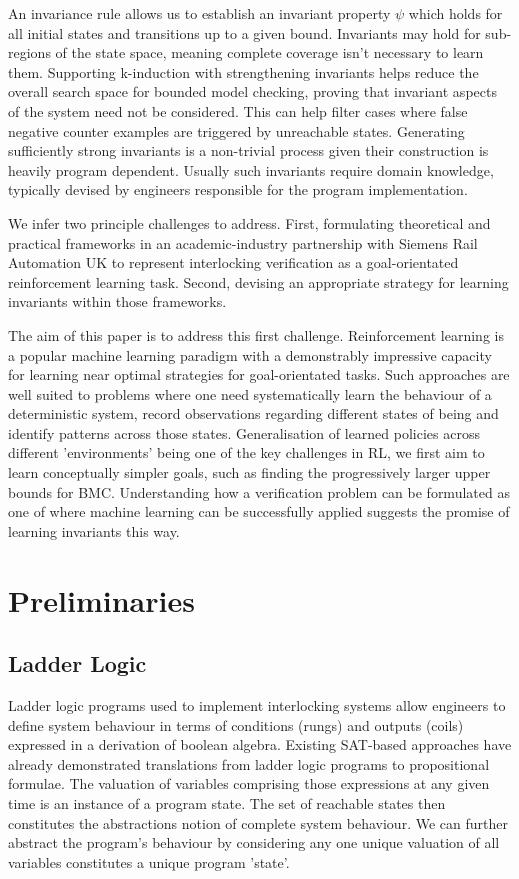 \documentclass[runningheads]{llncs}
\begin{document}
An invariance rule allows us to establish an invariant property $\psi$ which holds for all initial states and transitions up to a given bound. Invariants may hold for sub-regions of the state space, meaning complete coverage isn't necessary to learn them. Supporting k-induction with strengthening invariants helps reduce the overall search space for bounded model checking, proving that invariant aspects of the system need not be considered. This can help filter cases where false negative counter examples are triggered by unreachable states. Generating sufficiently strong invariants is a non-trivial process given their construction is heavily program dependent. Usually such invariants require domain knowledge, typically devised by engineers responsible for the program implementation. 

We infer two principle challenges to address. First, formulating theoretical and practical frameworks in an academic-industry partnership with Siemens Rail Automation UK to represent interlocking verification as a goal-orientated reinforcement learning task. Second, devising an appropriate strategy for learning invariants within those frameworks.

The aim of this paper is to address this first challenge. Reinforcement learning is a popular machine learning paradigm with a demonstrably impressive capacity for learning near optimal strategies for goal-orientated tasks. Such approaches are well suited to problems where one need systematically learn the behaviour of a deterministic system, record observations regarding different states of being and identify patterns across those states. Generalisation of learned policies across different 'environments' being one of the key challenges in RL, we first aim to learn conceptually simpler goals, such as finding the progressively larger upper bounds for BMC. Understanding how a verification problem can be formulated as one of where machine learning can be successfully applied suggests the promise of learning invariants this way.


\section{Preliminaries}\label{sec:preliminaries}

\subsection{Ladder Logic}
Ladder logic programs used to implement interlocking systems allow engineers to define system behaviour in terms of conditions (rungs) and outputs (coils) expressed in a derivation of boolean algebra. Existing SAT-based approaches have already demonstrated translations from ladder logic programs to propositional formulae. The valuation of variables comprising those expressions at any given time is an instance of a program state. The set of reachable states then constitutes the abstractions notion of complete system behaviour. We can further abstract the program's behaviour by considering any one unique valuation of all variables constitutes a unique program 'state'. 
\end{document}
